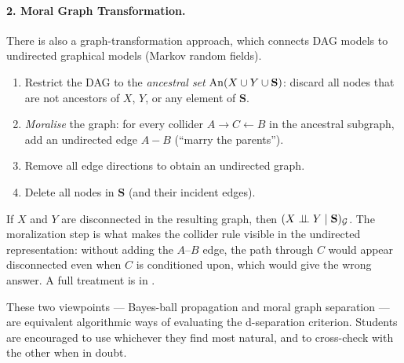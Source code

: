 \documentclass[master.tex]{subfiles}
\begin{document}
\paragraph{2. Moral Graph Transformation.}
There is also a graph-transformation approach, which connects DAG models
to undirected graphical models (Markov random fields).
\begin{enumerate}
  \item Restrict the DAG to the \emph{ancestral set}
        $\mathrm{An}(X \cup Y \cup \mathbf{S})$: discard all nodes that
        are not ancestors of $X$, $Y$, or any element of $\mathbf{S}$.
  \item \emph{Moralise} the graph: for every collider $A \to C \leftarrow
        B$ in the ancestral subgraph, add an undirected edge $A - B$
        (``marry the parents'').
  \item Remove all edge directions to obtain an undirected graph.
  \item Delete all nodes in $\mathbf{S}$ (and their incident edges).
\end{enumerate}
If $X$ and $Y$ are disconnected in the resulting graph, then
$(X \perp\!\!\!\perp Y \mid \mathbf{S})_{\mathcal{G}}$.
The moralization step is what makes the collider rule visible in the
undirected representation: without adding the $A$--$B$ edge, the path
through $C$ would appear disconnected even when $C$ is conditioned upon,
which would give the wrong answer.  A full treatment is in
\citet[][Ch.~3]{lauritzen1996graphical}.

\medskip
These two viewpoints --- Bayes-ball propagation and moral graph separation
--- are equivalent algorithmic ways of evaluating the d-separation criterion.
Students are encouraged to use whichever they find most natural, and to
cross-check with the other when in doubt.
\end{document}
